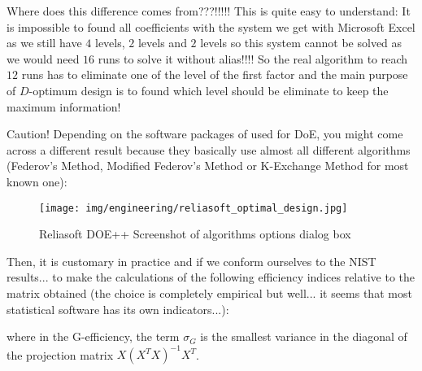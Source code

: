 	Where does this difference comes from???!!!!! This is quite easy to understand: It is impossible to found all coefficients with the system we get with Microsoft Excel as we still have $4$ levels, $2$ levels and $2$ levels so this system cannot be solved as we would need $16$ runs to solve it without alias!!!! So the real algorithm to reach $12$ runs has to eliminate one of the level of the first factor and the main purpose of $D$-optimum design is to found which level should be eliminate to keep the maximum information!
	\begin{tcolorbox}[title=Remark,colframe=black,arc=10pt]
	Caution! Depending on the software packages of used for DoE, you might come across a different result because they basically use almost all different algorithms (Federov's Method, Modified Federov's Method or K-Exchange Method for most known one):
	\begin{figure}[H]
		\centering
		\texttt{[image: img/engineering/reliasoft\_optimal\_design.jpg]}
		\caption[]{Reliasoft DOE++ Screenshot of algorithms options dialog box}
	\end{figure}
	\end{tcolorbox}
	Then, it is customary in practice and if we conform ourselves to the NIST results... to make the calculations of the following efficiency indices relative to the matrix obtained (the choice is completely empirical but well... it seems that most statistical software has its own indicators...):
	
	where in the G-efficiency, the term $\sigma_G$ is the smallest variance in the diagonal of the projection matrix $X(X^TX)^{-1}X^T$.
 
